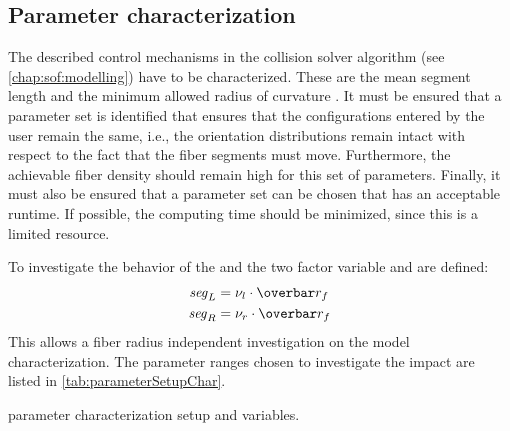 \subsection{Parameter characterization}\label{sec:modelSetup}
% 
The described control mechanisms in the collision solver algorithm  (see \cref{chap:sof:modelling}) have to be characterized.
These are the mean segment length \segLength{} and the minimum allowed radius of curvature \segRadius{}.
It must be ensured that a parameter set is identified that ensures that the configurations entered by the user remain the same, i.e., the orientation distributions remain intact with respect to the fact that the fiber segments must move.
Furthermore, the achievable fiber density should remain high for this set of parameters.
Finally, it must also be ensured that a parameter set can be chosen that has an acceptable runtime.
If possible, the computing time should be minimized, since this is a limited resource.
\par
% 
To investigate the behavior of the \segLength{} and \segRadius{} the two factor variable \segLengthFactor{} and \segRadiusFactor{} are defined:
\begin{align}
    \begin{split}
        \segLength &= \segLengthFactor \cdot \fiberRadiusMean\\
        \segRadius &= \segRadiusFactor \cdot \fiberRadiusMean
    \end{split}
\end{align}
This allows a fiber radius independent investigation on the model characterization.
The parameter ranges chosen to investigate the impact are listed in \cref{tab:parameterSetupChar}.
% 
\begin{table}[!b]
%
\centering
{}
\caption{parameter characterization setup and variables.}
\label{tab:parameterSetupChar}
\end{table}
